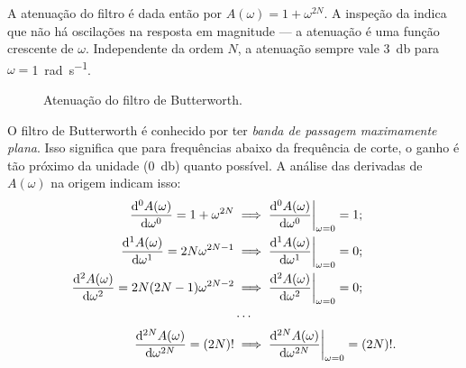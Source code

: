 A atenuação do filtro é dada então por $A(\omega)=1+\omega^{2N}$. A inspeção da  indica que não há oscilações na resposta em magnitude --- a atenuação é uma função crescente de $\omega$. Independente da ordem $N$, a atenuação sempre vale \qty{3}{\decibel} para $\omega=$\qty{1}{\radian\per\second}.

\begin{figure}[ht]
	\centering
	\caption{Atenuação do filtro de Butterworth.}
	\label{fig:abuttap}
\end{figure}

O filtro de Butterworth é conhecido por ter \emph{banda de passagem maximamente plana}. Isso significa que para frequências abaixo da frequência de corte, o ganho é tão próximo da unidade (\qty{0}{\decibel}) quanto possível. A análise das derivadas de $A(\omega)$ na origem indicam isso:
\begin{align*}
	\frac{\mathrm{d}^{0}A(\omega)}{\mathrm{d}\omega^{0}}=1+\omega^{2N}&\implies\frac{\mathrm{d}^{0}A(\omega)}{\mathrm{d}\omega^{0}}\bigg|_{\omega=0}=1;\\
	\frac{\mathrm{d}^{1}A(\omega)}{\mathrm{d}\omega^{1}}=2N\omega^{2N-1}&\implies\frac{\mathrm{d}^{1}A(\omega)}{\mathrm{d}\omega^{1}}\bigg|_{\omega=0}=0;\\
	\frac{\mathrm{d}^{2}A(\omega)}{\mathrm{d}\omega^{2}}=2N(2N-1)\omega^{2N-2}&\implies\frac{\mathrm{d}^{2}A(\omega)}{\mathrm{d}\omega^{2}}\bigg|_{\omega=0}=0;\\
	&\cdots\\
	\frac{\mathrm{d}^{2N}A(\omega)}{\mathrm{d}\omega^{2N}}=(2N)!&\implies\frac{\mathrm{d}^{2N}A(\omega)}{\mathrm{d}\omega^{2N}}\bigg|_{\omega=0}=(2N)!.\\
\end{align*}

